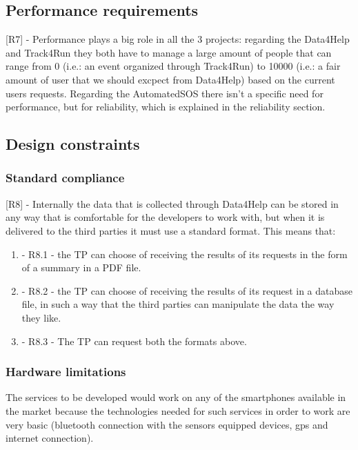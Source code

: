 {\color{secblue}\subsection{Performance requirements}}
[R7] - Performance plays a big role in all the 3 projects: regarding the Data4Help and Track4Run they both have to manage a large amount of people that can range from 0 (i.e.: an event organized through Track4Run) to 10000 (i.e.: a fair amount of user that we should excpect from Data4Help) based on the current users requests. Regarding the AutomatedSOS there isn't a specific need for performance, but for reliability, which is explained in the reliability section.
{\color{secblue}\subsection{Design constraints}}
{\color{secblue}\subsubsection{Standard compliance}}
[R8] - Internally the data that is collected through Data4Help can be stored in any way that is comfortable for the developers to work with, but when it is delivered to the third parties it must use a standard format.
This means that:
\begin{enumerate}
\item - R8.1 - the TP can choose of receiving the results of its requests in the form of a summary in a PDF file.
\item - R8.2 - the TP can choose of receiving the results of its request in a database file, in such a way that the third parties can manipulate the data the way they like.
\item - R8.3 - The TP can request both the formats above.
\end{enumerate}
{\color{secblue}\subsubsection{Hardware limitations}}
The services to be developed would work on any of the smartphones available in the market because the technologies needed for such services in order to work are very basic (bluetooth connection with the sensors equipped devices, gps and internet connection).

